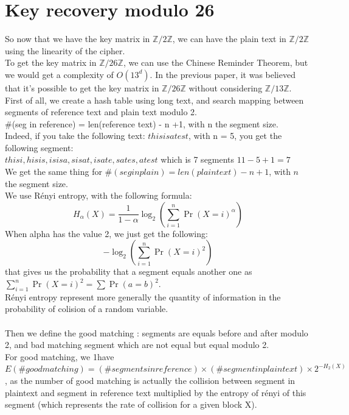 \documentclass{article}
\begin{document}
\section{Key recovery modulo 26}
So now that we have the key matrix in $\mathbb{Z}/2\mathbb{Z}$, we can have the plain text in $\mathbb{Z}/2\mathbb{Z}$ using the linearity of the cipher.\\
To get the key matrix in $\mathbb{Z}/26\mathbb{Z}$, we can use the Chinese Reminder Theorem, but we would get a complexity of $O(13^d)$. In the previous paper, it was believed that it's possible to get the key matrix in $\mathbb{Z}/26\mathbb{Z}$ without considering $\mathbb{Z}/13\mathbb{Z}$.\\
First of all, we create a hash table using long text, and search mapping between segments of reference text and plain text modulo 2.\\
\#(seg in reference) = len(reference text) - n +1, with n the segment size.\\
Indeed, if you take the following text: $thisisatest$, with n = 5, you get the following segment:\\
 $ thisi, hisis, isisa, sisat, isate, sates, atest $ which is 7 segments $ 11 - 5 + 1 = 7 $\\
We get the same thing for $\#(seg in plain) = len(plain text) - n +1$, with $n$ the segment size.\\
We use R\'enyi entropy, with the following formula:\\
$$H_{\alpha}(X) = \frac{1}{1-\alpha}\log_{2}(\sum_{i=1}^{n}{\Pr(X=i)^{\alpha}})$$ 
When alpha has the value 2, we just get the following:
$$-\log_{2}(\sum_{i=1}^{n}{\Pr(X=i)^{2}})$$ that gives us the probability that a segment equals another one as $\sum_{i=1}^{n}{\Pr(X=i)^{2}} = \sum{\Pr(a=b)^{2}}$.\\
R\'enyi entropy represent more generally the quantity of information in the probability of colision of a random variable.\\
\\
Then we define the good matching : segments are equals before and after modulo 2, and bad matching segment which are not equal but equal modulo 2.\\
${}$\hspace{1em}For good matching, we 1have $E(\# good matching) = (\# segments in reference) \times (\#segment in plaintext) \times 2^{-H_{2}(X)}$, as the number of good matching is actually the collision between segment in plaintext and segment in reference text multiplied by the entropy of r\'enyi of this segment (which represents the rate of collision for a given block X).\\
\end{document}
